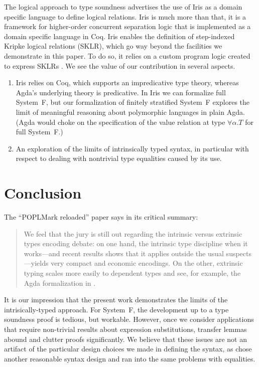 \documentclass[acmsmall,anonymous,review,screen]{acmart}
\begin{document}
The logical approach to type soundness
\cite{timany24:_logic_approac_type_sound} advertises the use of Iris
as a domain specific language to define logical relations. Iris
\cite{DBLP:journals/jfp/JungKJBBD18} is much more than that, it is a
framework for higher-order concurrent separation logic that is
implemented as a domain specific language in Coq.
Iris enables the definition of step-indexed Kripke logical relations (SKLR),
which go way beyond the facilities we demonstrate in this paper.
To do so, it relies on a custom program logic created to express SKLRs
\cite{DBLP:journals/corr/abs-1103-0510}. 
We see the value of our contribution in several aspects.
\begin{enumerate}
\item Iris relies on Coq, which supports an impredicative type
  theory, whereas Agda's underlying theory is predicative. In Iris we
  can formalize full System~F, but our
  formalization of finitely stratified System~F explores the limit of
  meaningful reasoning about polymorphic languages in plain Agda.
  (Agda would choke on the specification of the value relation at type
  $\forall\alpha.T$ for full System~F.)
\item An exploration of the limits of intrinsically typed syntax, in
  particular with respect to dealing with nontrivial type equalities
  caused by its use.
\end{enumerate}

\section{Conclusion}
\label{sec:conclusion}
\label{sec:future-work}

The ``POPLMark reloaded'' paper \cite[Section 5.1]{DBLP:journals/jfp/AbelAHPMSS19}
says in its critical summary:
\begin{quotation}
  We feel that the jury is still out regarding the intrinsic versus
  extrinsic types encoding debate: on one hand, the intrinsic type
  discipline when it works---and recent results
  \cite{DBLP:journals/pacmpl/PoulsenRTKV18} shows that it applies
  outside the usual suspects---yields very compact and economic
  encodings. On the other, extrinsic typing scales more easily to
  dependent types
  \cite{DBLP:conf/types/Danielsson06,DBLP:journals/entcs/Chapman09,DBLP:conf/popl/AltenkirchK16}
  and see, for example, the Agda formalization in \citet{DBLP:journals/pacmpl/0001OV18}. 
\end{quotation}
It is our impression that the present work demonstrates the limits of
the intrisically-typed approach. For System~F, the development up to a
type soundness proof is tedious, but workable. However, once we
consider applications that require non-trivial results about
expression substitutions, transfer lemmas abound and clutter proofs
significantly. We believe that these issues are not an artifact of the
particular design choices we made in defining the syntax, as
\citet{DBLP:journals/jar/BentonHKM12} chose another reasonable syntax
design and ran into the same problems with equalities.
\end{document}
